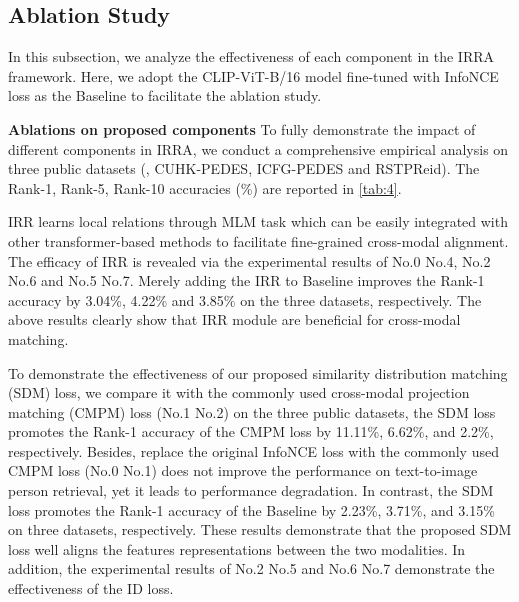 \documentclass[10pt,twocolumn,letterpaper]{article}
\begin{document}
\subsection{Ablation Study}
In this subsection, we analyze the effectiveness of each component in the IRRA framework. Here, we adopt the CLIP-ViT-B/16 model fine-tuned with InfoNCE loss as the Baseline to facilitate the ablation study.

\textbf{Ablations on proposed components} 
To fully demonstrate the impact of different components in IRRA, we conduct a comprehensive empirical analysis on three public datasets (\ie, CUHK-PEDES\cite{li2017person}, ICFG-PEDES\cite{ding2021semantically} and RSTPReid\cite{zhu2021dssl}). The Rank-1, Rank-5, Rank-10 accuracies (\%) are reported in \cref{tab:4}.

IRR learns local relations through MLM task which can be easily integrated with other transformer-based methods to facilitate fine-grained cross-modal alignment. The efficacy of IRR is revealed via the experimental results of No.0 \vs No.4, No.2 \vs No.6 and No.5 \vs No.7. Merely adding the IRR to Baseline improves the Rank-1 accuracy by 3.04\%, 4.22\% and 3.85\% on the three datasets, respectively.
The above results clearly show that IRR module are beneficial for cross-modal matching.

To demonstrate the effectiveness of our proposed similarity distribution matching (SDM) loss, we compare it with the commonly used cross-modal projection matching (CMPM) loss \cite{zhang2018deep} (No.1 \vs No.2) on the three public datasets, the SDM loss promotes the Rank-1 accuracy of the CMPM loss by 11.11\%, 6.62\%, and 2.2\%, respectively.
Besides, replace the original InfoNCE loss with the commonly used CMPM loss (No.0 \vs No.1) does not improve the performance on text-to-image person retrieval, yet it leads to performance degradation. In contrast, the SDM loss promotes the Rank-1 accuracy of the Baseline by 2.23\%, 3.71\%, and 3.15\% on three datasets, respectively. These results demonstrate that the proposed SDM loss well aligns the features representations between the two modalities.
In addition, the experimental results of No.2 \vs No.5 and No.6 \vs No.7 demonstrate the effectiveness of the ID loss. 

\begin{table}[]
\centering
{}
\caption{Comparisons between different Multimodal Interaction Module of IRRA on CUHK-PEDES.}
\label{tab:5}
\vspace{-4mm}
\end{table}
\end{document}
